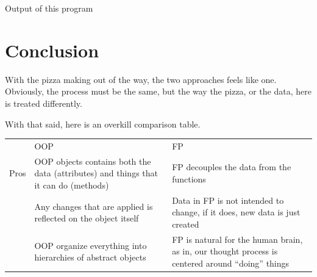 \documentclass[a4paper]{article}
\numberwithin{equation}{section}
\begin{document}
Output of this program

\newpage
\section{Conclusion}
With the pizza making out of the way, the two approaches feels like one.
Obviously, the process must be the same, but the way the pizza, or the data, here is treated differently.

With that said, here is an overkill comparison table.

\begin{center}
  \begin{tabularx}{\textwidth}{l*{2}{X}}
    \toprule
         & OOP                                                                                                                                                                                                    & FP                                                                                                                                                             \\
    \cmidrule(lr){2-3}
    Pros & OOP objects contains both the data (attributes) and things that it can do (methods)                                                                                                                    & FP decouples the data from the functions                                                                                                                       \\
         & Any changes that are applied is reflected on the object itself                                                                                                                                         & Data in FP is not intended to change, if it does, new data is just created                                                                                     \\
         & OOP organize everything into hierarchies of abstract objects                                                                                                                                           & FP is natural for the human brain, as in, our thought process is centered around ``doing'' things                                                              \\

\end{tabularx}
\end{center}
\end{document}

